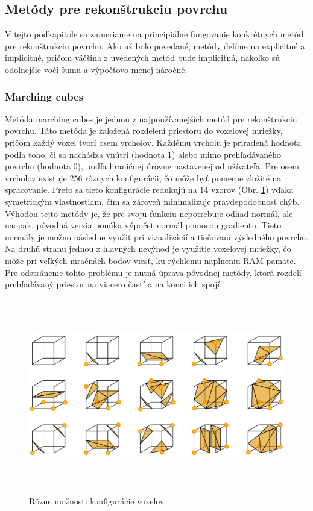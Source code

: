 \subsection{Metódy pre rekonštrukciu povrchu}
\noindent V tejto podkapitole sa zameriame na principiálne fungovanie konkrétnych metód pre rekonštrukciu povrchu. Ako už bolo povedané, metódy delíme na explicitné a implicitné, pričom väčšina z uvedených metód bude implicitná, nakoľko sú odolnejšie voči šumu a výpočtovo menej náročné. 
\subsubsection{Marching cubes} \label{sec:marching_cubes}
\noindent Metóda marching cubes je jednou z najpoužívanejších metód pre rekonštrukciu povrchu. Táto metóda je založená rozdelení priestoru do voxelovej mriežky, pričom každý voxel tvorí osem vrcholov. Každému vrcholu je priradená hodnota podľa toho, či sa nachádza vnútri (hodnota 1) alebo mimo prehľadávaného povrchu (hodnota 0), podľa hraničnej úrovne nastavenej od užívateľa. Pre osem vrcholov existuje 256 rôznych konfigurácii, čo môže byť pomerne zložité na spracovanie. Preto sa tieto konfigurácie redukujú na 14 vzorov (Obr. \ref{marchingCubes}) vďaka symetrickým vlastnostiam, čím sa zároveň minimalizuje pravdepodobnosť chýb. \cite{MarchingCubeas_origin}
\newline\indent Výhodou tejto metódy je, že pre svoju funkciu nepotrebuje odhad normál, ale naopak, pôvodná verzia ponúka výpočet normál pomocou gradientu. Tieto normály je možno následne využiť pri vizualizácií a tieňovaní výsledného povrchu. Na druhú stranu jednou z hlavných nevýhod je využitie voxelovej mriežky, čo môže pri veľkých mračnách bodov viesť, ku rýchlemu naplneniu RAM pamäte. Pre odstránenie tohto problému je nutná úprava pôvodnej metódy, ktorá rozdelí prehľadávaný priestor na viacero častí a na konci ich spojí.
\begin{figure}[!htbp]
  \centering
  \includegraphics[width=16cm, height=8.5cm]{img/marching_cubes.png}
  \caption{Rôzne možnosti konfigurácie voxelov \cite{MarchCubes_img}} 
  \label{marchingCubes}
\end{figure} 
